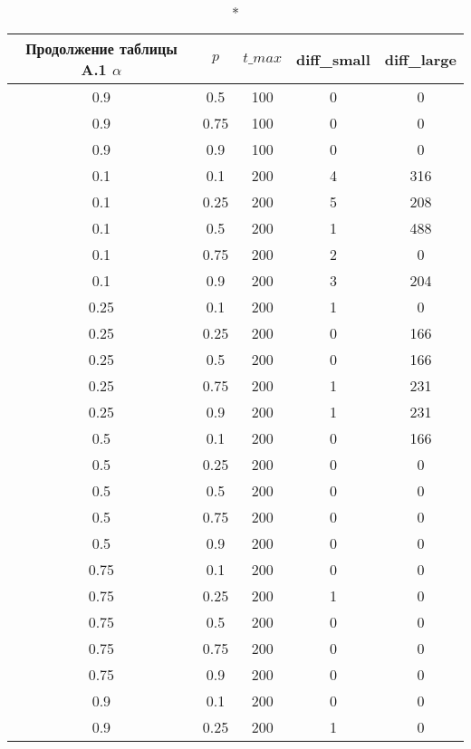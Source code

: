 \begin{longtable}[c]{|c|c|c|c|c|}
\caption*{Продолжение таблицы A.1}
\hline
$\alpha$ & $p$ & $t\_max$ & diff\_small & diff\_large
\tabularnewline 
\hline
0.9 & 0.5 & 100 & 0 & 0 \\ 
\hline
0.9 & 0.75 & 100 & 0 & 0 \\ 
\hline
0.9 & 0.9 & 100 & 0 & 0 \\ 
\hline
0.1 & 0.1 & 200 & 4 & 316 \\ 
\hline
0.1 & 0.25 & 200 & 5 & 208 \\ 
\hline
0.1 & 0.5 & 200 & 1 & 488 \\ 
\hline
0.1 & 0.75 & 200 & 2 & 0 \\ 
\hline
0.1 & 0.9 & 200 & 3 & 204 \\ 
\hline
0.25 & 0.1 & 200 & 1 & 0 \\ 
\hline
0.25 & 0.25 & 200 & 0 & 166 \\ 
\hline
0.25 & 0.5 & 200 & 0 & 166 \\ 
\hline
0.25 & 0.75 & 200 & 1 & 231 \\ 
\hline
0.25 & 0.9 & 200 & 1 & 231 \\ 
\hline
0.5 & 0.1 & 200 & 0 & 166 \\ 
\hline
0.5 & 0.25 & 200 & 0 & 0 \\ 
\hline
0.5 & 0.5 & 200 & 0 & 0 \\ 
\hline
0.5 & 0.75 & 200 & 0 & 0 \\ 
\hline
0.5 & 0.9 & 200 & 0 & 0 \\ 
\hline
0.75 & 0.1 & 200 & 0 & 0 \\ 
\hline
0.75 & 0.25 & 200 & 1 & 0 \\ 
\hline
0.75 & 0.5 & 200 & 0 & 0 \\ 
\hline
0.75 & 0.75 & 200 & 0 & 0 \\ 
\hline
0.75 & 0.9 & 200 & 0 & 0 \\ 
\hline
0.9 & 0.1 & 200 & 0 & 0 \\ 
\hline
0.9 & 0.25 & 200 & 1 & 0 \\ 
\hline
\end{longtable}

